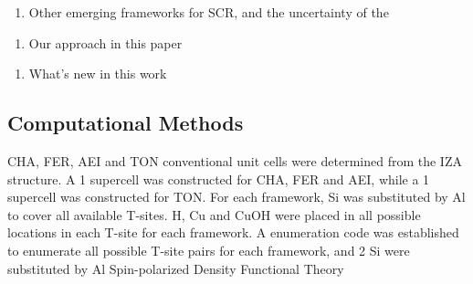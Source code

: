 \documentclass[12pt]{article}
\begin{document}
\begin{enumerate}[resume]
\item Other emerging frameworks for SCR, and the uncertainty of the
\end{enumerate}

\begin{enumerate}[resume]
\item Our approach in this paper
\end{enumerate}

\begin{enumerate}[resume]
\item What's new in this work
\end{enumerate}

\subsection*{Computational Methods}
CHA, FER, AEI and TON conventional unit cells were determined from the IZA structure. A 1 supercell was constructed for CHA, FER and AEI, while a 1 supercell was constructed for TON. For each framework, Si was  substituted by Al to cover all available T-sites. H, Cu and CuOH were placed in all possible locations in each T-site for each framework. A enumeration code was established to enumerate all possible T-site pairs for each framework, and 2 Si were substituted by Al Spin-polarized Density Functional Theory 
\end{document}
